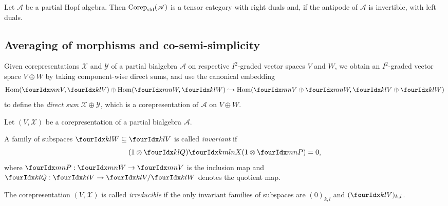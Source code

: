 \begin{Cor}
  Let $\mathscr{A}$ be a partial Hopf algebra. Then
  $\mathrm{Corep}_{\mathrm{sfd}}(\mathscr{A})$ is a tensor category with right
  duals and, if the antipode of $\mathscr{A}$ is invertible, with left duals.
\end{Cor}

\subsection{Averaging of morphisms and co-semi-simplicity}




Given corepresentations $\mathscr{X}$ and $\mathscr{Y}$ of
a partial bialgebra $\mathscr{A}$ on respective $I^{2}$-graded vector spaces $V$ and $W$,
we  obtain an $I^{2}$-graded vector space $V\oplus W$ by taking
component-wise direct sums, and use the canonical embedding 
\begin{align*}
  \Hom(\Gru{V}{m}{n},\Gru{V}{k}{l}) \oplus
  \Hom(\Gru{W}{m}{n},\Gru{W}{k}{l}) \hookrightarrow
  \Hom(\Gru{V}{m}{n} \oplus \Gru{W}{m}{n},\Gru{V}{k}{l} \oplus
  \Gru{W}{k}{l})
\end{align*}
to define the \emph{direct sum} $\mathscr{X} \oplus \mathscr{Y}$,
which is a corepresentation of $\mathscr{A}$ on $V\oplus W$.




\begin{Def} Let $(V,\mathscr{X})$ be a corepresentation of a partial
  bialgebra $\mathscr{A}$.  

  A family of subspaces $\Gru{W}{k}{l} \subseteq \Gru{V}{k}{l}$ is
  called \emph{invariant} if 
  \begin{align} \label{eq:corep-invariant}
(1\otimes
  \Gru{Q}{k}{l})\Gr{X}{k}{l}{m}{n}(1 \otimes \Gru{P}{m}{n}) =0,    
  \end{align}
  where $\Gru{P}{m}{n}:\Gru{W}{m}{n}\to\Gru{V}{m}{n}$ is the inclusion
  map and $\Gru{Q}{k}{l}:\Gru{V}{k}{l}\to\Gru{V}{k}{l}/\Gru{W}{k}{l}$
  denotes the quotient map.

  The corepresentation $(V,\mathscr{X})$ is called \emph{irreducible}
  if the only invariant families of subspaces are $(0)_{k,l}$ and
  $(\Gru{V}{k}{l})_{k,l}$.
\end{Def}


